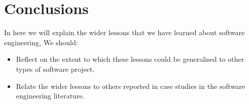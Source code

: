 \documentclass{l3proj}
\begin{document}
\section{Conclusions}

In here we will explain the wider lessons that we have learned about software engineering,
We should: 
\begin{itemize}
\item Reflect on the extent to which these lessons could be generalised to other types of software project. 
\item Relate the wider lessons to others reported in case studies in the software engineering literature.
\end{itemize}



\end{document}
